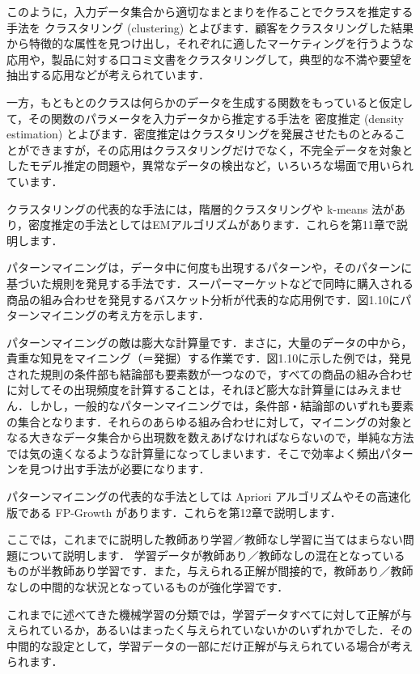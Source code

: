 このように，入力データ集合から適切なまとまりを作ることでクラスを推定する手法を
クラスタリング (clustering) 
とよびます．顧客をクラスタリングした結果から特徴的な属性を見つけ出し，それぞれに適したマーケティングを行うような応用や，製品に対する口コミ文書をクラスタリングして，典型的な不満や要望を抽出する応用などが考えられています．

一方，もともとのクラスは何らかのデータを生成する関数をもっていると仮定して，その関数のパラメータを入力データから推定する手法を
密度推定  (density estimation) 
とよびます．密度推定はクラスタリングを発展させたものとみることができますが，その応用はクラスタリングだけでなく，不完全データを対象としたモデル推定の問題や，異常なデータの検出など，いろいろな場面で用いられています．

クラスタリングの代表的な手法には，階層的クラスタリングや k-means 法があり，密度推定の手法としてはEMアルゴリズムがあります．これらを第11章で説明します．


パターンマイニングは，データ中に何度も出現するパターンや，そのパターンに基づいた規則を発見する手法です．スーパーマーケットなどで同時に購入される商品の組み合わせを発見するバスケット分析が代表的な応用例です．図1.10にパターンマイニングの考え方を示します．

パターンマイニングの敵は膨大な計算量です．まさに，大量のデータの中から，貴重な知見をマイニング（＝発掘）する作業です．図1.10に示した例では，発見された規則の条件部も結論部も要素数が一つなので，すべての商品の組み合わせに対してその出現頻度を計算することは，それほど膨大な計算量にはみえません．しかし，一般的なパターンマイニングでは，条件部・結論部のいずれも要素の集合となります．それらのあらゆる組み合わせに対して，マイニングの対象となる大きなデータ集合から出現数を数えあげなければならないので，単純な方法では気の遠くなるような計算量になってしまいます．そこで効率よく頻出パターンを見つけ出す手法が必要になります．

パターンマイニングの代表的な手法としては Apriori アルゴリズムやその高速化版である FP-Growth があります．これらを第12章で説明します．


ここでは，これまでに説明した教師あり学習／教師なし学習に当てはまらない問題について説明します．
学習データが教師あり／教師なしの混在となっているものが半教師あり学習です．また，与えられる正解が間接的で，教師あり／教師なしの中間的な状況となっているものが強化学習です．


これまでに述べてきた機械学習の分類では，学習データすべてに対して正解が与えられているか，あるいはまったく与えられていないかのいずれかでした．その中間的な設定として，学習データの一部にだけ正解が与えられている場合が考えられます．


